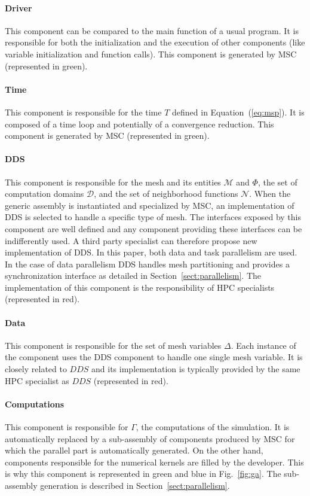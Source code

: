 \paragraph{\textbf{Driver}}
This component can be compared to the main function of a usual program. It is responsible for both the initialization and the execution of other components (like variable initialization and function calls). This component is generated by MSC (represented in green).

\paragraph{\textbf{Time}}
This component is responsible for the time $T$ defined in Equation~(\ref{eq:msp}). It is composed of a time loop and potentially of a convergence reduction. This component is generated by MSC (represented in green).

\paragraph{\textbf{DDS}}
This component is responsible for the mesh and its entities $\mathcal{M}$ and $\Phi$, the set of computation domains $\mathcal{D}$, and the set of neighborhood functions $\mathcal{N}$.
When the generic assembly is instantiated and specialized by MSC, an implementation of DDS is selected to handle a specific type of mesh.
The interfaces exposed by this component are well defined and any component providing these interfaces can be indifferently used.
A third party specialist can therefore propose new implementation of DDS.
In this paper, both data and task parallelism are used. In the case of data parallelism DDS handles mesh partitioning and provides a synchronization interface as detailed in Section~\ref{sect:parallelism}. The implementation of this component is the responsibility of HPC specialists (represented in red).

\paragraph{\textbf{Data}}
This component is responsible for the set of mesh variables $\Delta$.
Each instance of the component uses the DDS component to handle one single mesh variable.
It is closely related to $DDS$ and its implementation is typically provided by the same HPC specialist as $DDS$ (represented in red).

\paragraph{\textbf{Computations}}
This component is responsible for $\Gamma$, \ie the computations of the simulation. 
It is automatically replaced by a sub-assembly of components produced by MSC for which the parallel part is automatically generated. On the other hand, components responsible for the numerical kernels are filled by the developer. This is why this component is represented in green and blue in Fig.~\ref{fig:ga}. The sub-assembly generation is described in Section~\ref{sect:parallelism}.

